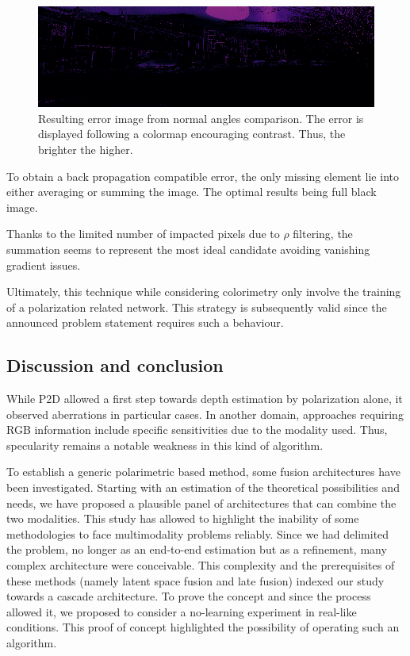 \begin{figure}[h]
	\centering
	\includegraphics[width=0.8\linewidth]{Figures/Fusion/resim}
	\caption[Resulting error image from normal angles comparison.]{Resulting error image from normal angles comparison. The error is displayed following a colormap encouraging contrast. Thus, the brighter the higher.}
	\label{fig:resim}
\end{figure}

To obtain a back propagation compatible error, the only missing element lie into either averaging or summing the image. The optimal results being full black image.

Thanks to the limited number of impacted pixels due to $\rho$ filtering, the summation seems to represent the most ideal candidate avoiding vanishing gradient issues. 

Ultimately, this technique while considering colorimetry only involve the training of a polarization related network. This strategy is subsequently valid since the announced problem statement requires such a behaviour. 

\subsection{Discussion and conclusion}

While P2D allowed a first step towards depth estimation by polarization alone, it observed aberrations in particular cases. 
In another domain, approaches requiring RGB information include specific sensitivities due to the modality used. Thus, specularity remains a notable weakness in this kind of algorithm.

To establish a generic polarimetric based method, some fusion architectures have been investigated. Starting with an estimation of the theoretical possibilities and needs, we have proposed a plausible panel of architectures that can combine the two modalities. This study has allowed to highlight the inability of some methodologies to face multimodality problems reliably. Since we had delimited the problem, no longer as an end-to-end estimation but as a refinement, many complex architecture were conceivable. This complexity and the prerequisites of these methods (namely latent space fusion and late fusion) indexed our study towards a cascade architecture.
To prove the concept and since the process allowed it, we proposed to consider a no-learning experiment in real-like conditions. This proof of concept highlighted the possibility of operating such an algorithm.

